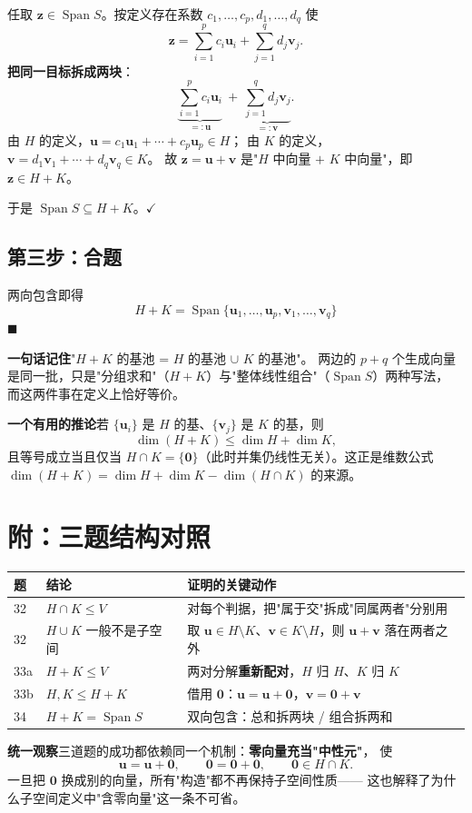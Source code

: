 \documentclass[11pt]{ctexart}
\newcommand{\Span}{\operatorname{Span}}
\newcommand{\0}{\mathbf{0}}
\begin{document}
任取 $\mathbf z\in\Span S$。按定义存在系数 $c_1,\dots,c_p,d_1,\dots,d_q$ 使
\[
\mathbf z=\sum_{i=1}^{p}c_i\mathbf u_i+\sum_{j=1}^{q}d_j\mathbf v_j .
\]
\textbf{把同一目标拆成两块}：
\[
\underbrace{\sum_{i=1}^{p}c_i\mathbf u_i}_{\textstyle =:\mathbf u}
\ +\ \underbrace{\sum_{j=1}^{q}d_j\mathbf v_j}_{\textstyle =:\mathbf v} .
\]
由 $H$ 的定义，$\mathbf u=c_1\mathbf u_1+\cdots+c_p\mathbf u_p\in H$；
由 $K$ 的定义，$\mathbf v=d_1\mathbf v_1+\cdots+d_q\mathbf v_q\in K$。
故 $\mathbf z=\mathbf u+\mathbf v$ 是"$H$ 中向量 $+$ $K$ 中向量"，即 $\mathbf z\in H+K$。

于是 $\Span S\subseteq H+K$。\hfill$\checkmark$

\subsection*{第三步：合题}

两向包含即得
\[
\boxed{\ H+K=\Span\{\mathbf u_1,\dots,\mathbf u_p,\mathbf v_1,\dots,\mathbf v_q\}\ }
\]
\hfill$\blacksquare$

\begin{keybox}
\textbf{一句话记住}\quad "$H+K$ 的基池 = $H$ 的基池 $\cup$ $K$ 的基池"。
两边的 $p+q$ 个生成向量是同一批，只是"分组求和"（$H+K$）与"整体线性组合"（$\Span S$）两种写法，
而这两件事在定义上恰好等价。

\smallskip
\textbf{一个有用的推论}\quad 若 $\{\mathbf u_i\}$ 是 $H$ 的基、$\{\mathbf v_j\}$ 是 $K$ 的基，则
\[
\dim(H+K)\le\dim H+\dim K ,
\]
且等号成立当且仅当 $H\cap K=\{\0\}$（此时并集仍线性无关）。这正是维数公式
$\dim(H+K)=\dim H+\dim K-\dim(H\cap K)$ 的来源。
\end{keybox}

\section*{附：三题结构对照}

\begin{center}\small
\begin{tabular}{@{}p{1.6cm}p{3.4cm}p{5.6cm}@{}}
\toprule
题 & 结论 & 证明的关键动作\\
\midrule
32 & $H\cap K\le V$ & 对每个判据，把"属于交"拆成"同属两者"分别用 \\
32 & $H\cup K$ 一般不是子空间 & 取 $\mathbf u\in H\setminus K$、$\mathbf v\in K\setminus H$，则 $\mathbf u+\mathbf v$ 落在两者之外 \\
33a & $H+K\le V$ & 两对分解\textbf{重新配对}，$H$ 归 $H$、$K$ 归 $K$ \\
33b & $H,K\le H+K$ & 借用 $\0$：$\mathbf u=\mathbf u+\0$，$\mathbf v=\0+\mathbf v$ \\
34 & $H+K=\Span S$ & 双向包含：总和拆两块 / 组合拆两和 \\
\bottomrule
\end{tabular}
\end{center}

\textbf{统一观察}\quad 三道题的成功都依赖同一个机制：\textbf{零向量充当"中性元"}，
使
\[
\mathbf u=\mathbf u+\0,\qquad \0=\0+\0,\qquad \mathbf 0\in H\cap K .
\]
一旦把 $\mathbf 0$ 换成别的向量，所有"构造"都不再保持子空间性质——
这也解释了为什么子空间定义中"含零向量"这一条不可省。
\end{document}
